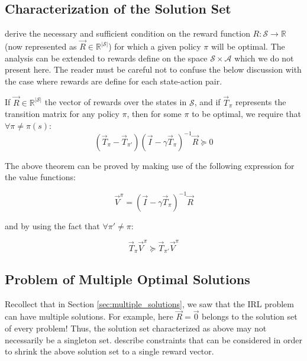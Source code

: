 \subsection{Characterization of the Solution Set}
 \citet{Ng:2000:AIR:645529.657801} derive the necessary and sufficient condition on the reward function $R: \mathcal{S} \to \mathbb{R}$ (now represented as $\vec{R} \in \mathbb{R}^{|\mathcal{S}|}$) for which a given policy $\pi$ will be optimal. The analysis can be extended to rewards define on the space $\mathcal{S} \times \mathcal{A}$ which we do not present here. The reader must be careful not to confuse the below discussion with the case where rewards are define for each state-action pair.
 
 \begin{thm}
 If $\vec{R} \in \mathbb{R}^{|\mathcal{S}|}$  the vector of rewards over the states in $\mathcal{S}$, and if $\vec{T}_{\pi}$ represents the transition matrix for any policy $\pi$, then for some $\pi$ to be optimal, we require that $\forall \pi \neq \pi(s)$:
 \begin{equation}
 (\vec{T}_{\pi}- \vec{T}_{\pi'})(\vec{I} - \gamma \vec{T}_{\pi})^{-1}\vec{R}  \succcurlyeq 0
 \end{equation}
 \end{thm}
 
 
The above theorem can be proved by making use of the following expression for the value functions:

\begin{equation}
\vec{V}^{\pi} = (\vec{I} -  \gamma\vec{T}_{\pi})^{-1}\vec{R}
\end{equation}

and by using the fact that $\forall \pi' \neq \pi$:

\begin{equation}
\vec{T}_{\pi}\vec{V}^{\pi} \succcurlyeq \vec{T}_{\pi'}\vec{V}^{\pi} 
\end{equation}

\subsection{Problem of Multiple Optimal Solutions}
Recollect that in Section \ref{sec:multiple_solutions}, we saw that the IRL problem can have multiple solutions. For example, here $\vec{R} = \vec{0}$ belongs to the solution set of every problem! Thus, the solution set characterized as above may not necessarily be a singleton set. 
 \citet{Ng:2000:AIR:645529.657801} describe constraints that can be considered in order to shrink the above solution set to a single reward vector. 
 
